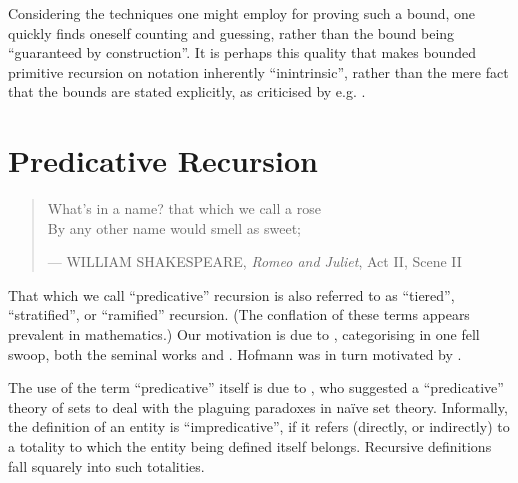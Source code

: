 Considering the techniques one might employ for proving such a bound, one
quickly finds oneself counting and guessing, rather than the bound being
``guaranteed by construction''.  It is perhaps this quality that makes bounded
primitive recursion on notation inherently ``inintrinsic'', rather than the
mere fact that the bounds are stated explicitly, as criticised by e.g.
\cite{hofmann-2000a}.

\section{Predicative Recursion}

\begin{quotation}

\footnotesize\sffamily\itshape

\begin{flushright}

What's in a name? that which we call a rose \\
By any other name would smell as sweet;

\smallbreak

\upshape

--- WILLIAM SHAKESPEARE, \emph{Romeo and Juliet}, Act II, Scene II

\end{flushright}

\end{quotation}

That which we call ``predicative'' recursion is also referred to as
``tiered''\cite{leivant-1990}, ``stratified''\cite{leivant-1993}, or
``ramified''\cite{leivant-1995} recursion. (The conflation of these terms
appears prevalent in mathematics.) Our motivation is due to
\cite{hofmann-2000a}, categorising in one fell swoop, both the seminal works
\cite{bellantoni-cook-1992} and \cite{leivant-1995}. Hofmann was in turn
motivated by \cite{bellantoni-phd-1992}.

The use of the term ``predicative'' itself is due to \cite{russell-1907}, who
suggested a ``predicative'' theory of sets to deal with the plaguing paradoxes
in na\"ive set theory. Informally, the definition of an entity is
``impredicative''\cite{goedel-1944}, if it refers (directly, or indirectly) to
a totality to which the entity being defined itself belongs. Recursive
definitions fall squarely into such totalities. 



